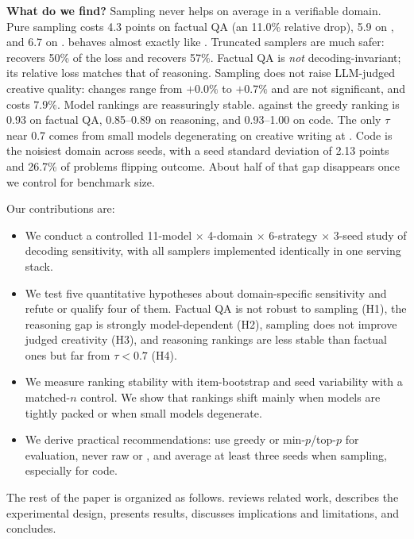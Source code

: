 {\bf What do we find?} Sampling never helps on average in a verifiable domain. Pure \tone sampling costs 4.3 points on factual QA (an 11.0\% relative drop), 5.9 on \gsm, and 6.7 on \humaneval. \topk behaves almost exactly like \tone. Truncated samplers are much safer: \topp recovers 50\% of the \gsm loss and \minp recovers 57\%. Factual QA is \emph{not} decoding-invariant; its relative loss matches that of reasoning. Sampling does not raise LLM-judged creative quality: changes range from $+0.0\%$ to $+0.7\%$ and are not significant, and \tone costs $7.9\%$. Model rankings are reassuringly stable. \ktau against the greedy ranking is 0.93 on factual QA, 0.85--0.89 on reasoning, and 0.93--1.00 on code. The only $\tau$ near 0.7 comes from small models degenerating on creative writing at \tone. Code is the noisiest domain across seeds, with a seed standard deviation of 2.13 points and 26.7\% of problems flipping outcome. About half of that gap disappears once we control for benchmark size.

Our contributions are:
\begin{itemize}[leftmargin=*,itemsep=0pt,topsep=0pt]
    \item We conduct a controlled 11-model $\times$ 4-domain $\times$ 6-strategy $\times$ 3-seed study of decoding sensitivity, with all samplers implemented identically in one serving stack.
    \item We test five quantitative hypotheses about domain-specific sensitivity and refute or qualify four of them. Factual QA is not robust to sampling (H1), the reasoning gap is strongly model-dependent (H2), sampling does not improve judged creativity (H3), and reasoning rankings are less stable than factual ones but far from $\tau<0.7$ (H4).
    \item We measure ranking stability with item-bootstrap \ktau and seed variability with a matched-$n$ control. We show that rankings shift mainly when models are tightly packed or when small models degenerate.
    \item We derive practical recommendations: use greedy or min-$p$/top-$p$ for evaluation, never raw \tone or \topk, and average at least three seeds when sampling, especially for code.
\end{itemize}

The rest of the paper is organized as follows.  reviews related work,  describes the experimental design,  presents results,  discusses implications and limitations, and  concludes.
